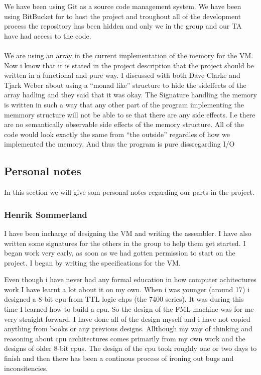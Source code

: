 \documentclass{article}
\begin{document}
We have been using Git as a source code management system. We have been using
BitBucket for to host the project and troughout all of the development process
the repository has been hidden and only we in the group and our TA have had
access to the code.\\
\\
We are using an array  in the current implementation of the memory for the VM.
Now i know that it is stated in the project description that the project should
be written in a functional and pure way. I discussed with both Dave Clarke and
Tjark Weber about using a ``monad like'' structure to hide the sideffects of the
array hadling and they said that it was okay. The Signature handling the memory
is written in such a way that any other part of the program implementing the
memmory structure will not be able to se that there are any side effects. I.e
there are no semantically observable side effects of the memory structure. All
of the code would look exactly the same from ``the outside'' regardles of how we
implemented the memory. And thus the program is pure dissregarding I/O

\subsection{Personal notes}
In this section we will give som personal notes regarding our parts in the
project.
\subsubsection{Henrik Sommerland}
I have been incharge of designing the VM and writing the assembler. I have also
written some signatures for the others in the group to help them get started. I
began work very early, as soon as we had gotten permission to start on the
project. I  began by writing the specifications for the VM.

Even though i have never had any formal education in how computer achitectures
work I have learnt a lot about it on my own. When i was younger (around 17) i
designed a 8-bit cpu from TTL logic chps (the 7400 series). It was during this
time I learned how to build a cpu. So the design of the FML machine was for me
very straight forward. I have done all of the design myself and i have not
copied anything from books or any previous designs. Allthough my way of thinking
and reasoning about cpu architectures comes primarily from my own work and the
designs of older 8-bit cpus. The design of the cpu took roughly one or two days
to finish and then there has been a continous process of ironing out bugs and
inconsitencies.
\end{document}

